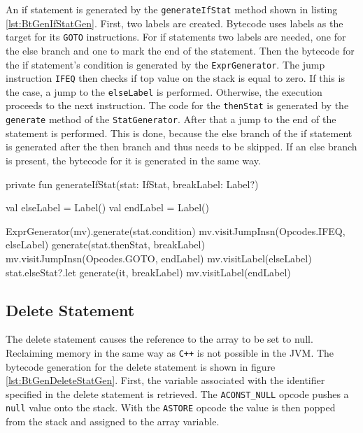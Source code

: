 An if statement is generated by the \verb|generateIfStat| method shown in listing \ref{lst:BtGenIfStatGen}. First, two labels are created. Bytecode uses labels as the target for its \verb|GOTO| instructions. For if statements two labels are needed, one for the else branch and one to mark the end of the statement. Then the bytecode for the if statement's condition is generated by the \verb|ExprGenerator|. The jump instruction \verb|IFEQ| then checks if top value on the stack is equal to zero. If this is the case, a jump to the \verb|elseLabel| is performed. Otherwise, the execution proceeds to the next instruction. The code for the \verb|thenStat| is generated by the \verb|generate| method of the \verb|StatGenerator|. After that a jump to the end of the statement is performed. This is done, because the else branch of the if statement is generated after the then branch and thus needs to be skipped. If an else branch is present, the bytecode for it is generated in the same way.



\begin{KotlinCode}[float,numbers=none,caption=Implementation of the \texttt{generateIfStat} method of the \texttt{StatGenerator}., label=lst:BtGenIfStatGen]
private fun generateIfStat(stat: IfStat, breakLabel: Label?) {
    val elseLabel = Label()
    val endLabel = Label()

    ExprGenerator(mv).generate(stat.condition)
    mv.visitJumpInsn(Opcodes.IFEQ, elseLabel)
    generate(stat.thenStat, breakLabel)
    mv.visitJumpInsn(Opcodes.GOTO, endLabel)
    mv.visitLabel(elseLabel)
    stat.elseStat?.let { generate(it, breakLabel) }
    mv.visitLabel(endLabel)
}
\end{KotlinCode}

\subsection{Delete Statement}

The delete statement causes the reference to the array to be set to null. Reclaiming memory in the same way as \verb|C++| is not possible in the JVM. The bytecode generation for the delete statement is shown in figure \ref{lst:BtGenDeleteStatGen}. First, the variable associated with the identifier specified in the delete statement is retrieved. The \verb|ACONST_NULL| opcode pushes a \verb|null| value onto the stack. With the \verb|ASTORE| opcode the value is then popped from the stack and assigned to the array variable. 


